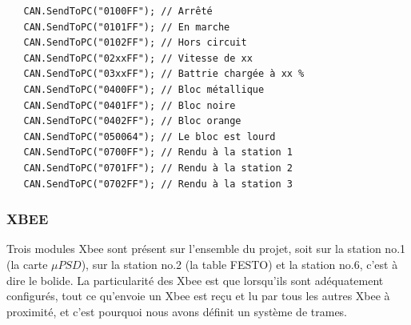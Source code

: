 \documentclass[10pt,a4paper,final]{article}
\begin{document}
\begin{lstlisting}
   CAN.SendToPC("0100FF"); // Arrêté
   CAN.SendToPC("0101FF"); // En marche
   CAN.SendToPC("0102FF"); // Hors circuit
   CAN.SendToPC("02xxFF"); // Vitesse de xx
   CAN.SendToPC("03xxFF"); // Battrie chargée à xx %
   CAN.SendToPC("0400FF"); // Bloc métallique
   CAN.SendToPC("0401FF"); // Bloc noire
   CAN.SendToPC("0402FF"); // Bloc orange
   CAN.SendToPC("050064"); // Le bloc est lourd
   CAN.SendToPC("0700FF"); // Rendu à la station 1
   CAN.SendToPC("0701FF"); // Rendu à la station 2
   CAN.SendToPC("0702FF"); // Rendu à la station 3
\end{lstlisting}
\begin{spacing}{1.5}
\pagebreak

\subsubsection{XBEE}
Trois modules Xbee sont présent sur l'ensemble du projet, soit sur la station no.1 (la carte $\mu PSD$), sur la station no.2 (la table FESTO) et la station no.6, c'est à dire le bolide. La particularité des Xbee est que lorsqu'ils sont adéquatement configurés, tout ce qu'envoie un Xbee est reçu et lu par tous les autres Xbee à proximité, et c'est pourquoi nous avons définit un système de trames.




\end{spacing}
\end{document}
